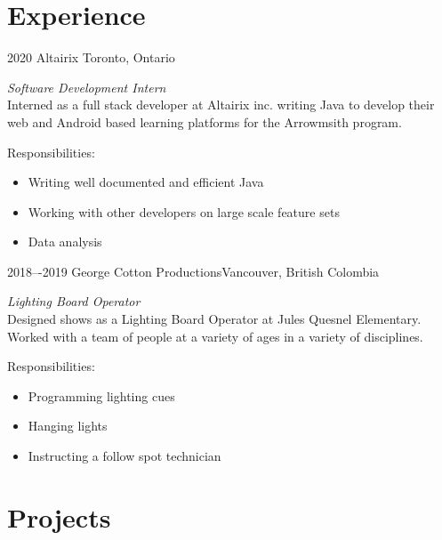 \documentclass[]{style}
\begin{document}
\section{Experience}

\begin{entrylist}


\entry
{2020}
{Altairix}
{Toronto, Ontario}
{\emph{Software Development Intern} \\
Interned as a full stack developer at Altairix inc. writing Java to develop their web and Android based learning platforms for the Arrowmsith program.

Responsibilities:

\begin{itemize}
	\item Writing well documented and efficient Java
	\item Working with other developers on large scale feature sets
	\item Data analysis
\end{itemize}}


\entry
{2018–-2019}
{George Cotton Productions}{Vancouver, British Colombia}
{\emph{Lighting Board Operator} \\
Designed shows as a Lighting Board Operator at Jules Quesnel Elementary. Worked with a team of people at a variety of ages in a variety of disciplines.

Responsibilities:

\begin{itemize}
	\item Programming lighting cues
	\item Hanging lights
	\item Instructing a follow spot technician
\end{itemize}}


\end{entrylist}



\section{Projects}
\end{document}
